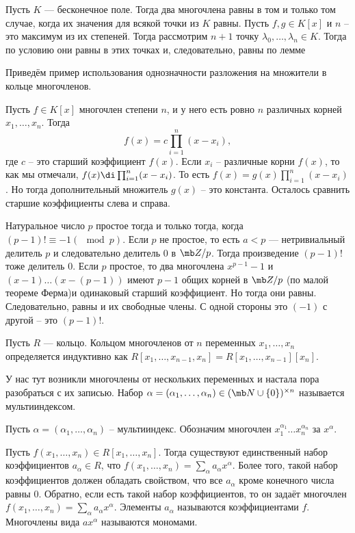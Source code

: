 Пусть $K$ --- бесконечное поле. Тогда два многочлена равны в том и только том случае, когда их значения для всякой точки из $K$ равны.
\ethrm
\proof Пусть $f,g\in K[x]$  и $n$ -- это максимум из их степеней. Тогда рассмотрим $n+1$ точку $\lambda_0,\dots,\lambda_n \in K$. Тогда по условию они равны в этих точках и, следовательно, равны по лемме
\endproof


Приведём пример использования однозначности разложения на множители в кольце многочленов.

\utv Пусть $f\in K[x]$  многочлен степени $n$, и у него есть ровно $n$ различных корней $x_1,\dots,x_n$. Тогда 
$$f(x)=c \prod_{i=1}^n (x-x_i),$$
где $c$ -- это старший коэффициент $f(x)$.
\eutv
\proof Если $x_i$ -- различные корни $f(x)$, то как мы отмечали,  $f(x) \di \prod_{i=1}^n(x-x_i)$. То есть $f(x) = g(x)\prod_{i=1}^n(x-x_i)$. Но тогда дополнительный множитель $g(x)$ -- это константа. Осталось сравнить старшие коэффициенты слева и справа.
\endproof

 Натуральное число $p$ простое тогда и только тогда, когда $(p-1)! \equiv -1(\mod p)$.
\ethrm
\proof Если $p$ не простое, то есть $a<p$ --- нетривиальный делитель $p$ и следовательно делитель $0$ в $\mb Z/p$. Тогда произведение $(p-1)!$ тоже делитель 0.
Если $p$ простое, то два многочлена $x^{p-1}-1$  и $(x-1)\dots(x-(p-1))$ имеют $p-1$ общих корней в $\mb Z/p$ (по малой теореме Ферма)и одинаковый старший коэффициент. Но тогда они равны. Следовательно, равны и их свободные члены. С одной стороны это $(-1)$ с другой -- это $(p-1)!$.
\endproof




 Пусть $R$ — кольцо. Кольцом многочленов от $n$ переменных $x_1, \dots, x_n $ определяется индуктивно как $R[x_1,\dots,x_{n-1},x_n]=R[x_1,\dots,x_{n-1}][x_n]$.
\edfn



У нас тут возникли многочлены от нескольких переменных и настала пора разобраться с их записью.
\dfn Набор $\alpha=(\alpha_1,\dots,\alpha_n) \in (\mb N\cup\{0\})^{\times n}$ называется мультииндексом.
\edfn

\dfn Пусть $\alpha=(\alpha_1,\dots,\alpha_n)$ -- мультииндекс. Обозначим многочлен $x_1^{\alpha_1}\dots x_n^{\alpha_n}$ за $x^{\alpha}$.
\edfn

\rm Пусть $f(x_1,\dots,x_n) \in R[x_1,\dots,x_n]$. Тогда существуют единственный набор коэффициентов $a_{\alpha}\in R$, что $f(x_1,\dots,x_n)=\sum_{\alpha} a_{\alpha}x^{\alpha}$. Более того, такой набор коэффициентов должен обладать свойством, что все $a_{\alpha}$ кроме конечного числа равны 0. Обратно, если есть такой набор коэффициентов, то он задаёт многочлен $f(x_1,\dots,x_n)=\sum_{\alpha} a_{\alpha}x^{\alpha}$. Элементы $a_{\alpha}$ называются коэффициентами $f$. Многочлены вида $ax^{\alpha}$ называются мономами.
 \erm




